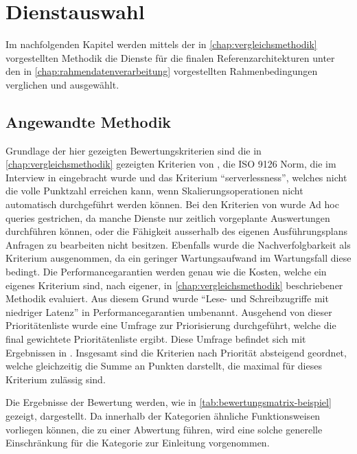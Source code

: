 \chapter{Dienstauswahl}
Im nachfolgenden Kapitel werden mittels der in \autoref{chap:vergleichsmethodik} vorgestellten Methodik die Dienste für die finalen Referenzarchitekturen unter den in \autoref{chap:rahmendatenverarbeitung} vorgestellten Rahmenbedingungen verglichen und ausgewählt.

\section{Angewandte Methodik}

Grundlage der hier gezeigten Bewertungskriterien sind die in \autoref{chap:vergleichsmethodik} gezeigten Kriterien von \citeauthor{Marz.2015}, die ISO 9126 Norm, die im Interview in  eingebracht wurde und das Kriterium \enquote{serverlessness}, welches nicht die volle Punktzahl erreichen kann, wenn Skalierungsoperationen nicht automatisch durchgeführt werden können. Bei den Kriterien von \citeauthor{Marz.2015} wurde Ad hoc queries gestrichen, da manche Dienste nur zeitlich vorgeplante Auswertungen durchführen können, oder die Fähigkeit ausserhalb des eigenen Ausführungsplans Anfragen zu bearbeiten nicht besitzen. Ebenfalls wurde die Nachverfolgbarkeit als Kriterium ausgenommen, da ein geringer Wartungsaufwand im Wartungsfall diese bedingt. Die Performancegarantien werden genau wie die Kosten, welche ein eigenes Kriterium sind, nach eigener, in \autoref{chap:vergleichsmethodik} beschriebener Methodik evaluiert. Aus diesem Grund wurde \enquote{Lese- und Schreibzugriffe mit niedriger Latenz} in Performancegarantien umbenannt. Ausgehend von dieser Prioritätenliste wurde eine Umfrage zur Priorisierung durchgeführt, welche die final gewichtete Prioritätenliste ergibt. Diese Umfrage befindet sich mit Ergebnissen in . Insgesamt sind die Kriterien nach Priorität absteigend geordnet, welche gleichzeitig die Summe an Punkten darstellt, die maximal für dieses Kriterium zulässig sind.





Die Ergebnisse der Bewertung werden, wie in \autoref{tab:bewertungsmatrix-beispiel} gezeigt, dargestellt.  Da innerhalb der Kategorien ähnliche Funktionsweisen vorliegen können, die zu einer Abwertung führen, wird eine solche generelle Einschränkung für die Kategorie zur Einleitung vorgenommen.

